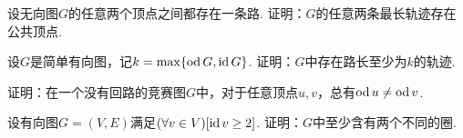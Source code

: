 \begin{example}
设无向图\(G\)的任意两个顶点之间都存在一条路.
证明：\(G\)的任意两条最长轨迹存在公共顶点.
\end{example}

\begin{example}
设\(G\)是简单有向图，记\(k = \max\{\operatorname{od} G,\operatorname{id} G\}\).
证明：\(G\)中存在路长至少为\(k\)的轨迹.
\end{example}

\begin{example}
证明：在一个没有回路的竞赛图\(G\)中，对于任意顶点\(u,v\)，总有\(\operatorname{od} u \neq \operatorname{od} v\).
\end{example}

\begin{example}
设有向图\(G = (V,E)\)满足\((\forall v \in V)[\operatorname{id} v \geq 2]\).
证明：\(G\)中至少含有两个不同的圈.
\end{example}


